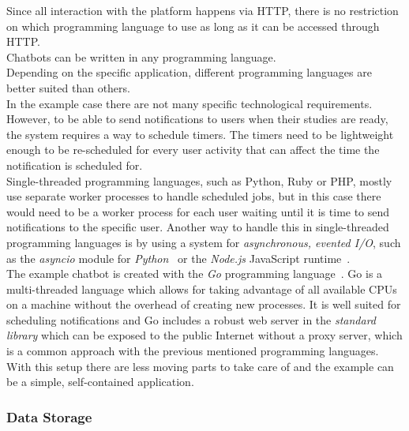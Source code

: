 Since all interaction with the platform happens via HTTP,
there is no restriction on which programming language to use as long as it can be accessed through HTTP.
\\
Chatbots can be written in any programming language.
\\
Depending on the specific application, different programming languages are better suited than others.
\\
In the example case there are not many specific technological requirements.
However, to be able to send notifications to users when their studies are ready,
the system requires a way to schedule timers.
The timers need to be lightweight enough to be re-scheduled for every user activity
that can affect the time the notification is scheduled for.
\\
Single-threaded programming languages, such as Python, Ruby or PHP,
mostly use separate worker processes to handle scheduled jobs,
but in this case there would need to be a worker process for each user
waiting until it is time to send notifications to the specific user.
Another way to handle this in single-threaded programming languages is by using a system for \emph{asynchronous, evented I/O},
such as the \emph{asyncio} module for \emph{Python}~\cite{asyncio} or the \emph{Node.js} JavaScript runtime~\cite{nodejs}.
\\
The example chatbot is created with the \emph{Go} programming language~\cite{golang}.
Go is a multi-threaded language which allows for taking advantage of all available CPUs
on a machine without the overhead of creating new processes.
It is well suited for scheduling notifications and Go includes a robust web server in the \emph{standard library} which can be exposed to the public Internet without a proxy server, which is a common approach with the previous mentioned programming languages.
\\
With this setup there are less moving parts to take care of and the example can be a simple, self-contained application.
\\


\subsubsection{Data Storage}

